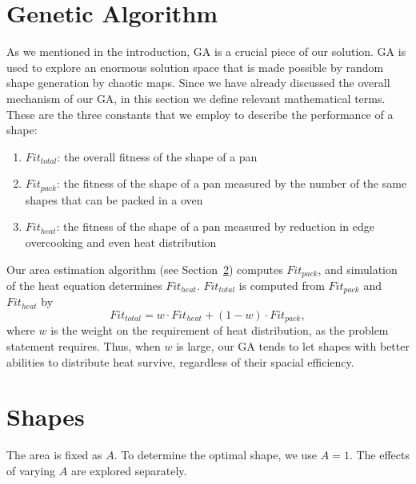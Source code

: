\documentclass[12pt]{reedmcm}
\begin{document}
\section{Genetic Algorithm}
\label{sec:ga}
As we mentioned in the introduction, GA is a crucial piece of our solution.
GA is used to explore an enormous solution space that is made possible by random shape generation by chaotic maps.
Since we have already discussed the overall mechanism of our GA, in this section we define relevant mathematical terms.
These are the three constants that we employ to describe the performance of a shape:
\begin{enumerate}
  \item $Fit_{total}$: the overall fitness of the shape of a pan 
  \item $Fit_{pack}$: the fitness of the shape of a pan measured by the number of the same shapes that can be packed in a oven
  \item $Fit_{heat}$:  the fitness of the shape of a pan measured by reduction in edge overcooking and even heat distribution 
\end{enumerate}
Our area estimation algorithm (see Section~\ref{sec:shapes}) computes $Fit_{pack}$, and simulation of the heat equation determines $Fit_{heat}$.
$Fit_{total}$ is computed from $Fit_{pack}$ and $Fit_{heat}$ by
\begin{equation*}
  Fit_{total} = w \cdot Fit_{heat} + (1-w) \cdot Fit_{pack},
\end{equation*}
where $w$ is the weight on the requirement of heat distribution, as the problem statement requires.
Thus, when $w$ is large, our GA tends to let shapes with better abilities to distribute heat survive, regardless of their spacial efficiency.

\section{Shapes}
\label{sec:shapes}
The area is fixed as $A$. To determine the optimal shape, we use $A=1$. The effects of varying $A$ are explored separately.
\end{document}
